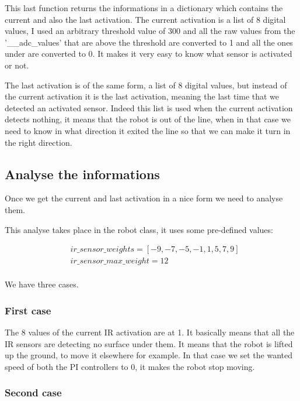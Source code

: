 This last function returns the informations in a dictionary which contains the current and also the last activation.
The current activation is a list of 8 digital values, I used an arbitrary threshold value of 300 and all the raw values from the '\_\_adc\_values' that are above the threshold are converted to 1 and all the ones under are converted to 0.
It makes it very easy to know what sensor is activated or not.

The last activation is of the same form, a list of 8 digital values, but instead of the current activation it is the last activation, meaning the last time that we detected an activated sensor.
Indeed this list is used when the current activation detects nothing, it means that the robot is out of the line, when in that case we need to know in what direction it exited the line so that we can make it turn in the right direction.

\subsection*{Analyse the informations}

Once we get the current and last activation in a nice form we need to analyse them.

This analyse takes place in the robot class, it uses some pre-defined values:

\begin{align*}
    &ir\_sensor\_weights = [-9, -7, -5, -1, 1, 5, 7, 9]\\
    &ir\_sensor\_max\_weight = 12\\
\end{align*}

We have three cases.

\subsubsection*{First case}

The 8 values of the current IR activation are at 1.
It basically means that all the IR sensors are detecting no surface under them.
It means that the robot is lifted up the ground, to move it elsewhere for example.
In that case we set the wanted speed of both the PI controllers to 0, it makes the robot stop moving.

\subsubsection*{Second case}

